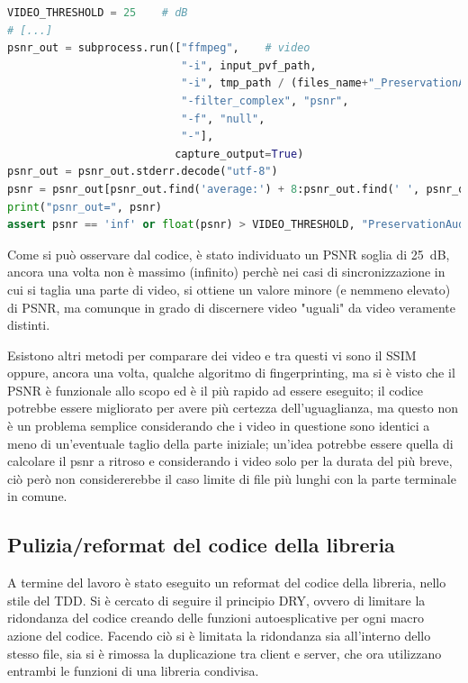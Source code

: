 \begin{lstlisting}[language=Python, caption=Test di comparazione di due file audio tramite il psnr]
VIDEO_THRESHOLD = 25    # dB
# [...]
psnr_out = subprocess.run(["ffmpeg",    # video
                           "-i", input_pvf_path,
                           "-i", tmp_path / (files_name+"_PreservationAudioVisualFile_output_video.mov"),
                           "-filter_complex", "psnr",
                           "-f", "null",
                           "-"],
                          capture_output=True)
psnr_out = psnr_out.stderr.decode("utf-8")
psnr = psnr_out[psnr_out.find('average:') + 8:psnr_out.find(' ', psnr_out.find('average:'))]
print("psnr_out=", psnr)
assert psnr == 'inf' or float(psnr) > VIDEO_THRESHOLD, "PreservationAudioVisualFile.mov is not the same as input"
\end{lstlisting}

Come si può osservare dal codice, è stato individuato un \ac{PSNR} soglia di \qty{25}{\dB}, ancora una volta non è massimo (infinito) perchè nei casi di sincronizzazione in cui si taglia una parte di video, si ottiene un valore minore (e nemmeno elevato) di \ac{PSNR}, ma comunque in grado di discernere video "uguali" da video veramente distinti.

Esistono altri metodi per comparare dei video e tra questi vi sono il \ac{SSIM} oppure, ancora una volta, qualche algoritmo di fingerprinting, ma si è visto che il \ac{PSNR} è funzionale allo scopo ed è il più rapido ad essere eseguito; il codice potrebbe essere migliorato per avere più certezza dell'uguaglianza, ma questo non è un problema semplice considerando che i video in questione sono identici a meno di un'eventuale taglio della parte iniziale; un'idea potrebbe essere quella di calcolare il psnr a ritroso e considerando i video solo per la durata del più breve, ciò però non considererebbe il caso limite di file più lunghi con la parte terminale in comune.


\subsection{Pulizia/reformat del codice della libreria} \label{ssec:packager-post}  %
A termine del lavoro è stato eseguito un reformat del codice della libreria, nello stile del \ac{TDD}.
Si è cercato di seguire il principio \ac{DRY}, ovvero di limitare la ridondanza del codice creando delle funzioni autoesplicative per ogni macro azione del codice.
Facendo ciò si è limitata la ridondanza sia all'interno dello stesso file, sia si è rimossa la duplicazione tra client e server, che ora utilizzano entrambi le funzioni di una libreria condivisa.

